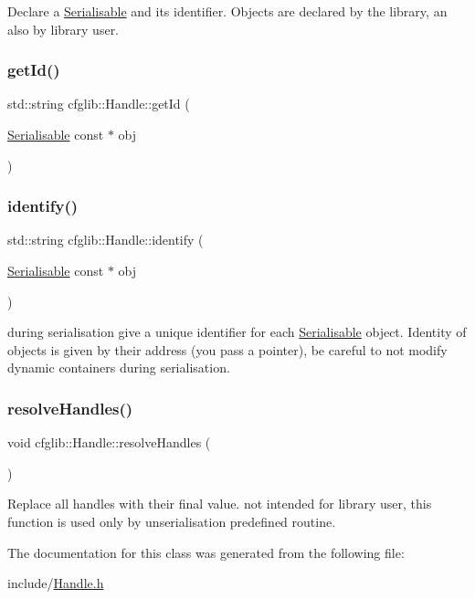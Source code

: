 Declare a \hyperlink{classcfglib_1_1Serialisable}{Serialisable} and its identifier. Objects are declared by the library, an also by library user. \mbox{\label{classcfglib_1_1Handle_a90922bce066e04b5d46df9d29b641840}} 
\subsubsection{\texorpdfstring{get\+Id()}{getId()}}
{\footnotesize\ttfamily std\+::string cfglib\+::\+Handle\+::get\+Id (\begin{DoxyParamCaption}\item[{\hyperlink{classcfglib_1_1Serialisable}{Serialisable} const $\ast$}]{obj }\end{DoxyParamCaption})}

\mbox{\label{classcfglib_1_1Handle_afdd041bbbaea61823ad61918ceaad330}} 
\subsubsection{\texorpdfstring{identify()}{identify()}}
{\footnotesize\ttfamily std\+::string cfglib\+::\+Handle\+::identify (\begin{DoxyParamCaption}\item[{\hyperlink{classcfglib_1_1Serialisable}{Serialisable} const $\ast$}]{obj }\end{DoxyParamCaption})}

during serialisation give a unique identifier for each \hyperlink{classcfglib_1_1Serialisable}{Serialisable} object. Identity of objects is given by their address (you pass a pointer), be careful to not modify dynamic containers during serialisation. \mbox{\label{classcfglib_1_1Handle_a8f524a2c4b97e7e3dda8aaa0d6dcd577}} 
\subsubsection{\texorpdfstring{resolve\+Handles()}{resolveHandles()}}
{\footnotesize\ttfamily void cfglib\+::\+Handle\+::resolve\+Handles (\begin{DoxyParamCaption}{ }\end{DoxyParamCaption})}

Replace all handles with their final value. not intended for library user, this function is used only by unserialisation predefined routine. 

The documentation for this class was generated from the following file\+:\begin{DoxyCompactItemize}
\item 
include/\hyperlink{Handle_8h}{Handle.\+h}\end{DoxyCompactItemize}

